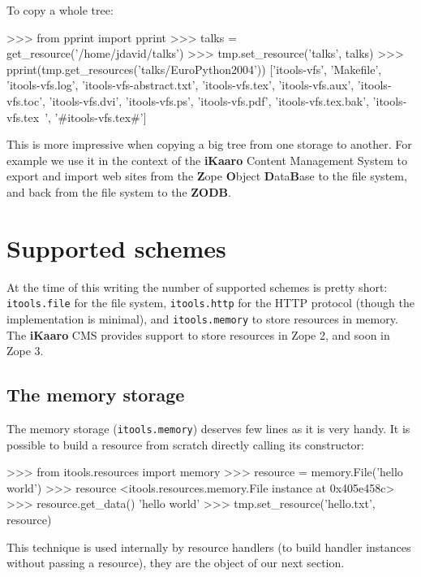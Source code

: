 To copy a whole tree:

\begin{code}
    >>> from pprint import pprint
    >>> talks = get_resource('/home/jdavid/talks')
    >>> tmp.set_resource('talks', talks)
    >>> pprint(tmp.get_resources('talks/EuroPython2004'))
    ['itools-vfs',
     'Makefile',
     'itools-vfs.log',
     'itools-vfs-abstract.txt',
     'itools-vfs.tex',
     'itools-vfs.aux',
     'itools-vfs.toc',
     'itools-vfs.dvi',
     'itools-vfs.ps',
     'itools-vfs.pdf',
     'itools-vfs.tex.bak',
     'itools-vfs.tex~',
     '#itools-vfs.tex#']
\end{code}

This is more impressive when copying a big tree from one storage to another.
For example we use it in the context of the {\bf iKaaro} Content Management
System to export and import web sites from the {\bf Z}ope {\bf O}bject
{\bf D}ata{\bf B}ase to the file system, and back from the file system to the
{\bf ZODB}.


\section{Supported schemes}

At the time of this writing the number of supported schemes is pretty short:
{\tt itools.file} for the file system, {\tt itools.http} for the HTTP
protocol (though the implementation is minimal), and {\tt itools.memory}
to store resources in memory. The {\bf iKaaro} CMS provides support to
store resources in Zope 2, and soon in Zope 3.

\subsection{The memory storage}

The memory storage ({\tt itools.memory}) deserves few lines as it is very
handy. It is possible to build a resource from scratch directly calling its
constructor:

\begin{code}
    >>> from itools.resources import memory
    >>> resource = memory.File('hello world')
    >>> resource
    <itools.resources.memory.File instance at 0x405e458c>
    >>> resource.get_data()
    'hello world'
    >>> tmp.set_resource('hello.txt', resource)
\end{code}

This technique is used internally by resource handlers (to build handler
instances without passing a resource), they are the object of our next
section.
